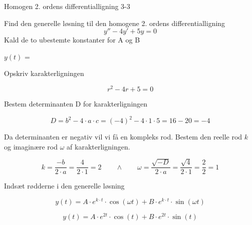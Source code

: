 \documentclass{article}
\begin{document}
\begin{exercise}{Homogen 2. ordens differentialligning 3-3}
	
	Find den generelle løsning til den homogene 2. ordens differentialligning
	\[
	y'' - 4y' + 5y = 0
	\]
	Kald de to ubestemte konstanter for A og B
	
	$y(t)$ = 
	
	
	\hint 
	
	Opskriv karakterligningen
	
	\hint
	
	\[
	r^2 - 4r + 5 = 0
	\]
	
	
	\hint
	
	Bestem determinanten D for karakterligningen
	
	
	\hint 
	\[
	D = b^2 - 4 \cdot a \cdot c = (-4)^2 - 4 \cdot 1 \cdot 5 = 16 - 20 = -4
	\]
	
	\hint 
	Da determinanten er negativ vil vi få en kompleks rod. Bestem den reelle rod $k$ og imaginære rod $\omega$ af karakterligningen.
	
	
	\hint
	
	\[
	k = \frac{-b}{2 \cdot a} = \frac{4}{2 \cdot 1} = 2 \qquad \wedge \qquad \omega = \frac{\sqrt{-D}}{2 \cdot a} = \frac{\sqrt{4}}{2 \cdot 1} = \frac{2}{2} = 1
	\]
	
	\hint
	
	Indsæt rødderne i den generelle løsning
	
	\hint
	\[
	y(t) = A \cdot e^{k \cdot t}  \cdot \cos(\omega t)+ B \cdot e^{k \cdot t}  \cdot \sin(\omega t)
	\]
	
	\hint
	
	\[
	y(t) = A \cdot e^{2 t}  \cdot \cos(t)+ B \cdot e^{2 t}  \cdot \sin(t)
	\]
	
\end{exercise}
\end{document}
